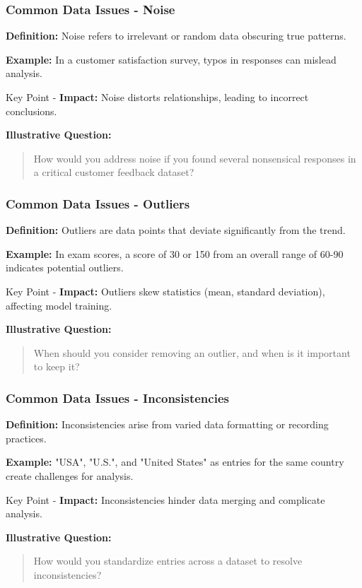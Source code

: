\documentclass[aspectratio=169]{beamer}
\begin{document}
\begin{frame}[fragile]
    \frametitle{Common Data Issues - Noise}
    \textbf{Definition:} Noise refers to irrelevant or random data obscuring true patterns.  
    \vspace{0.2cm}
    
    \textbf{Example:} In a customer satisfaction survey, typos in responses can mislead analysis.

    \begin{block}{Key Point}
        - \textbf{Impact:} Noise distorts relationships, leading to incorrect conclusions.
    \end{block}
    
    \textbf{Illustrative Question:} 
    \begin{quote}
        How would you address noise if you found several nonsensical responses in a critical customer feedback dataset?
    \end{quote}
\end{frame}

\begin{frame}[fragile]
    \frametitle{Common Data Issues - Outliers}
    \textbf{Definition:} Outliers are data points that deviate significantly from the trend.
    \vspace{0.2cm}
    
    \textbf{Example:} In exam scores, a score of 30 or 150 from an overall range of 60-90 indicates potential outliers.

    \begin{block}{Key Point}
        - \textbf{Impact:} Outliers skew statistics (mean, standard deviation), affecting model training.
    \end{block}
    
    \textbf{Illustrative Question:} 
    \begin{quote}
        When should you consider removing an outlier, and when is it important to keep it?
    \end{quote}
\end{frame}

\begin{frame}[fragile]
    \frametitle{Common Data Issues - Inconsistencies}
    \textbf{Definition:} Inconsistencies arise from varied data formatting or recording practices.
    \vspace{0.2cm}
    
    \textbf{Example:} "USA", "U.S.", and "United States" as entries for the same country create challenges for analysis.

    \begin{block}{Key Point}
        - \textbf{Impact:} Inconsistencies hinder data merging and complicate analysis.
    \end{block}
    
    \textbf{Illustrative Question:} 
    \begin{quote}
        How would you standardize entries across a dataset to resolve inconsistencies?
    \end{quote}
\end{frame}
\end{document}
